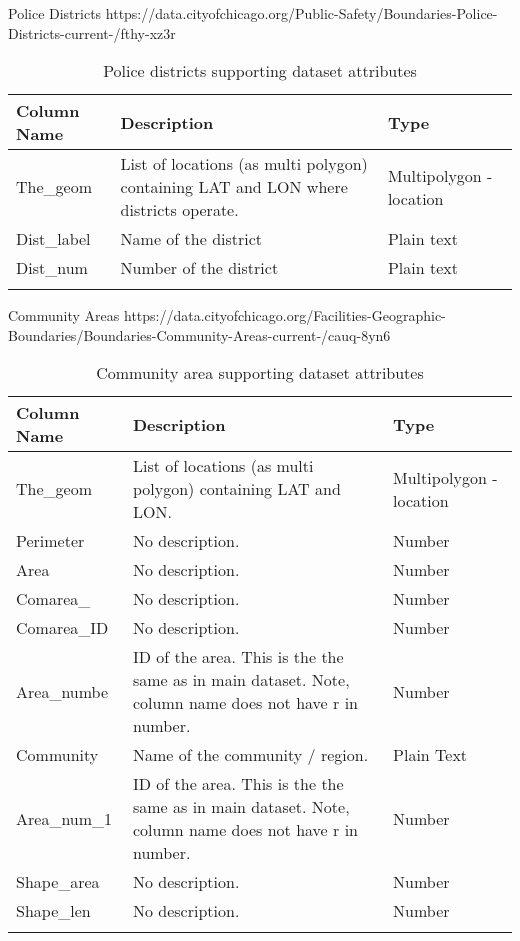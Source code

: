 Police Districts \newline
https://data.cityofchicago.org/Public-Safety/Boundaries-Police-Districts-current-/fthy-xz3r
\begin{center}
\begin{longtable}{|m{6em}|m{18em}|m{7em}|}
    \hline
    Column Name & 
    Description & 
    Type\\
    \hline
    The\_geom & 
    List of locations (as multi polygon) containing LAT and LON where districts operate.  & 
    Multipolygon - location\\
    \hline
    Dist\_label & 
    Name of the district & 
    Plain text\\
    \hline
    Dist\_num & 
    Number of the district & 
    Plain text\\
    \hline
\caption{Police districts supporting dataset attributes}
\end{longtable}
\end{center}

Community Areas \newline
https://data.cityofchicago.org/Facilities-Geographic-Boundaries/Boundaries-Community-Areas-current-/cauq-8yn6
\begin{center}
\begin{longtable}{|m{6em}|m{18em}|m{7em}|}
    \hline
    Column Name & 
    Description & 
    Type\\
    \hline
    The\_geom & 
    List of locations (as multi polygon) containing LAT and LON. & 
    Multipolygon - location\\
    \hline
    Perimeter & 
    No description. & 
    Number\\
    \hline
    Area & 
    No description. & 
    Number\\
    \hline
    Comarea\_ & 
    No description. & 
    Number\\
    \hline
    Comarea\_ID & 
    No description. & 
    Number\\
    \hline
    Area\_numbe & 
    ID of the area. This is the the same as in main dataset. Note, column name does not have r in number. & 
    Number\\
    \hline
    Community & 
    Name of the community / region. & 
    Plain Text\\
    \hline
    Area\_num\_1 & 
    ID of the area. This is the the same as in main dataset. Note, column name does not have r in number. & 
    Number\\
    \hline
    Shape\_area & 
    No description. & 
    Number\\
    \hline
    Shape\_len & 
    No description. & 
    Number\\
    \hline
\caption{Community area supporting dataset attributes}
\end{longtable}
\end{center}


